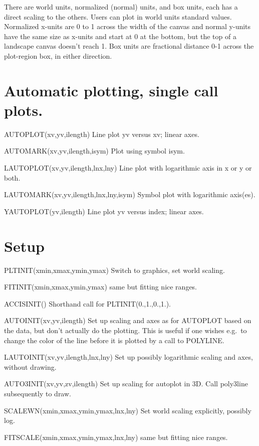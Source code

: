 \documentclass[12pt]{article}
\newif \iftth
\begin{document}
There are world units, normalized (normal) units, and box units, each
has a direct scaling to the others. Users can plot in world units
standard values. Normalized x-units are 0 to 1 across the width of the
canvas and normal y-units have the same size as x-units and start at 0
at the bottom, but the top of a landscape canvas doesn't reach 1. Box
units are fractional distance 0-1 across the plot-region box, in
either direction.

\section{Automatic plotting, single call plots.}

\iftth \special{html:<a href="plottest.f"><img align="right" src="plainplot.png"></a>}\fi
AUTOPLOT(xv,yv,ilength) Line plot yv versus xv; linear axes.

AUTOMARK(xv,yv,ilength,isym) Plot using symbol isym.

LAUTOPLOT(xv,yv,ilength,lnx,lny) Line plot with logarithmic axis in x
or y or both.

LAUTOMARK(xv,yv,ilength,lnx,lny,isym) Symbol plot with logarithmic axis(es).
 
YAUTOPLOT(yv,ilength) Line plot yv versus index; linear axes.


\section{Setup}

PLTINIT(xmin,xmax,ymin,ymax) Switch to graphics, set world scaling.

FITINIT(xmin,xmax,ymin,ymax) same but fitting nice ranges.

ACCISINIT() Shorthand call for PLTINIT(0.,1.,0.,1.).

AUTOINIT(xv,yv,ilength) Set up scaling and axes as for AUTOPLOT based
on the data, but don't actually do the plotting. This is useful if one
wishes e.g.\  to change the color of the line before it is plotted by
a call to POLYLINE.

LAUTOINIT(xv,yv,ilength,lnx,lny) Set up possibly logarithmic scaling
and axes, without drawing.

AUTO3INIT(xv,yv,zv,ilength) Set up scaling for autoplot in 3D. Call poly3line
subsequently to draw.

SCALEWN(xmin,xmax,ymin,ymax,lnx,lny) Set world scaling explicitly, possibly log.

FITSCALE(xmin,xmax,ymin,ymax,lnx,lny) same but fitting nice ranges.
\end{document}
